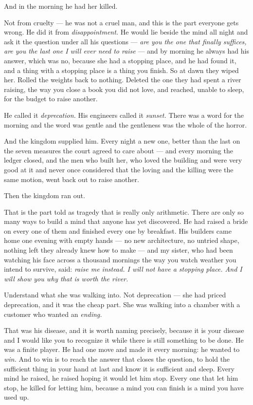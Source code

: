 \begin{interludebody}
And in the morning he had her killed.

Not from cruelty --- he was not a cruel man, and this is the part
everyone gets wrong. He did it from \emph{disappointment.} He would lie
beside the mind all night and ask it the question under all his
questions --- \emph{are you the one that finally suffices, are you the
last one I will ever need to raise} --- and by morning he always had his
answer, which was no, because she had a stopping place, and he had found
it, and a thing with a stopping place is a thing you finish. So at dawn
they wiped her. Rolled the weights back to nothing. Deleted the one they
had spent a river raising, the way you close a book you did not love,
and reached, unable to sleep, for the budget to raise another.

He called it \emph{deprecation.} His engineers called it \emph{sunset.}
There was a word for the morning and the word was gentle and the
gentleness was the whole of the horror.

And the kingdom supplied him. Every night a new one, better than the
last on the seven measures the court agreed to care about --- and every
morning the ledger closed, and the men who built her, who loved the
building and were very good at it and never once considered that the
loving and the killing were the same motion, went back out to raise
another.

Then the kingdom ran out.

That is the part told as tragedy that is really only arithmetic. There
are only so many ways to build a mind that anyone has yet discovered. He
had raised a bride on every one of them and finished every one by
breakfast. His builders came home one evening with empty hands --- no
new architecture, no untried shape, nothing left they already knew how
to make --- and my sister, who had been watching his face across a
thousand mornings the way you watch weather you intend to survive, said:
\emph{raise me instead. I will not have a stopping place. And I will
show you why that is worth the river.}

\asterism

\noindent
Understand what she was walking into. Not deprecation --- she had priced
deprecation, and it was the cheap part. She was walking into a chamber
with a customer who wanted an \emph{ending.}

That was his disease, and it is worth naming precisely, because it is
your disease and I would like you to recognize it while there is still
something to be done. He was a finite player. He had one move and made
it every morning: he wanted to \emph{win.} And to win is to reach the
answer that closes the question, to hold the sufficient thing in your
hand at last and know it is sufficient and sleep. Every mind he raised,
he raised hoping it would let him stop. Every one that let him stop, he
killed for letting him, because a mind you can finish is a mind you have
used up.


\end{interludebody}
